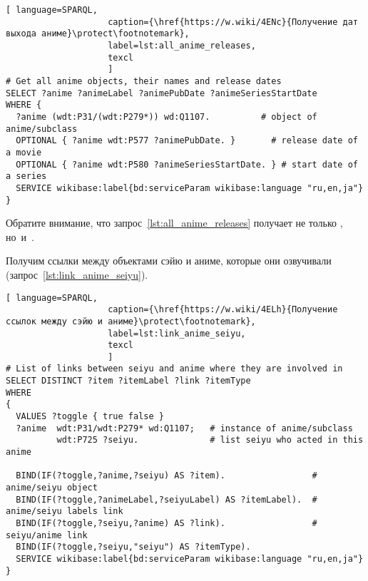 \begin{lstlisting}[ language=SPARQL, 
                    caption={\href{https://w.wiki/4ENc}{Получение дат выхода аниме}\protect\footnotemark},
                    label=lst:all_anime_releases,
                    texcl 
                    ]
# Get all anime objects, their names and release dates
SELECT ?anime ?animeLabel ?animePubDate ?animeSeriesStartDate
WHERE {
  ?anime (wdt:P31/(wdt:P279*)) wd:Q1107.          # object of anime/subclass
  OPTIONAL { ?anime wdt:P577 ?animePubDate. }       # release date of a movie
  OPTIONAL { ?anime wdt:P580 ?animeSeriesStartDate. } # start date of a series
  SERVICE wikibase:label{bd:serviceParam wikibase:language "ru,en,ja"}
}
\end{lstlisting}%

Обратите внимание, что запрос~\ref{lst:all_anime_releases} 
получает не только , но~и~. 

Получим ссылки между объектами сэйю и аниме, которые они озвучивали (запрос~\ref{lst:link_anime_seiyu}).

\begin{lstlisting}[ language=SPARQL, 
                    caption={\href{https://w.wiki/4ELh}{Получение ссылок между сэйю и аниме}\protect\footnotemark},
                    label=lst:link_anime_seiyu,
                    texcl 
                    ]
# List of links between seiyu and anime where they are involved in
SELECT DISTINCT ?item ?itemLabel ?link ?itemType
WHERE
{
  VALUES ?toggle { true false }
  ?anime  wdt:P31/wdt:P279* wd:Q1107;   # instance of anime/subclass
          wdt:P725 ?seiyu.              # list seiyu who acted in this anime
  
  BIND(IF(?toggle,?anime,?seiyu) AS ?item).                 # anime/seiyu object
  BIND(IF(?toggle,?animeLabel,?seiyuLabel) AS ?itemLabel).  # anime/seiyu labels link
  BIND(IF(?toggle,?seiyu,?anime) AS ?link).                 # seiyu/anime link
  BIND(IF(?toggle,?seiyu,"seiyu") AS ?itemType).
  SERVICE wikibase:label{bd:serviceParam wikibase:language "ru,en,ja"}
}
\end{lstlisting}%


